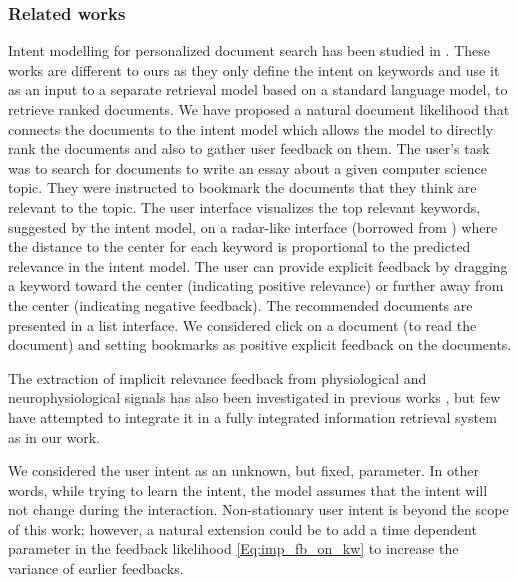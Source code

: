 \documentclass[dissertation,math,vertlayout,pdfa,colorlinks]{aaltoseries}
\begin{document}
\subsubsection{Related works}
Intent modelling for personalized document search has been studied in  \cite{GlowIUI2013,ruotsalo2015interactive,Ruotsalo2018}. These works are different to ours as they only define the intent on keywords and use it as an input to a separate retrieval model based on a standard language model, to retrieve ranked documents. We have proposed a natural document likelihood that connects the documents to the intent model which allows the model to directly rank the documents and also to gather user feedback on them. The user's task was to search for documents to write an essay about a given computer science topic. They were instructed to bookmark the documents that they think are relevant to the topic. The user interface visualizes the top relevant keywords, suggested by the intent model, on a radar-like interface (borrowed from \cite{GlowIUI2013}) where the distance to the center for each keyword is proportional to the predicted relevance in the intent model. The user can provide explicit feedback by dragging a keyword toward the center (indicating positive relevance) or further away from the center (indicating negative feedback). The recommended documents are presented in a list interface. We considered click on a document (to read the document) and setting bookmarks as positive explicit feedback on the documents. 

The extraction of implicit relevance feedback from physiological and neurophysiological signals has also been investigated in previous works \cite{OSwald_2015,Manuel2016natural}, but few have attempted to integrate it in a fully integrated information retrieval system as in our work.

We considered the user intent as an unknown, but fixed, parameter. In other words, while trying to learn the intent, the model assumes that the intent will not change during the interaction. Non-stationary user intent is beyond the scope of this work; however, a natural extension could be to add a time dependent parameter in the feedback likelihood \ref{Eq:imp_fb_on_kw} to increase the variance of earlier feedbacks. 
\end{document}
